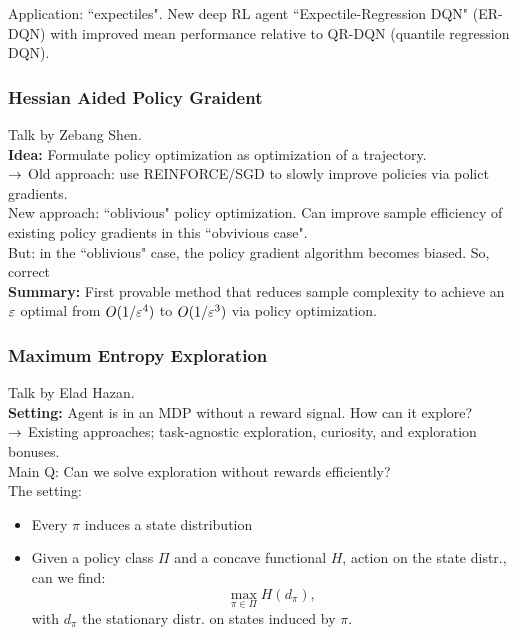  Application: ``expectiles". New deep RL agent ``Expectile-Regression DQN" (ER-DQN) with improved mean performance relative to QR-DQN (quantile regression DQN).
 
 \spacerule
 
 \subsubsection{Hessian Aided Policy Graident}
 Talk by Zebang Shen. \\
 
 {\bf Idea:} Formulate policy optimization as optimization of a trajectory. \\
 
 $\rightarrow$ Old approach: use REINFORCE/SGD to slowly improve policies via polict gradients. \\
 
 New approach: ``oblivious" policy optimization. Can improve sample efficiency of existing policy gradients in this ``obvivious case". \\
 
 But: in the ``oblivious" case, the policy gradient algorithm becomes biased. So, correct \\
 
 {\bf Summary:} First provable method that reduces sample complexity to achieve an $\varepsilon$ optimal from $O(1/\varepsilon^4)$ to $O(1/\varepsilon^3)$ via policy optimization.
 
 \spacerule
 
 \subsubsection{Maximum Entropy Exploration}
 
 Talk by Elad Hazan. \\
 
 {\bf Setting:} Agent is in an MDP without a reward signal. How can it explore? \\
 
 $\rightarrow$ Existing approaches; task-agnostic exploration, curiosity, and exploration bonuses. \\
 
 Main Q: Can we solve exploration without rewards efficiently? \\
 
 The setting:
 \begin{itemize}
     \item Every $\pi$ induces a state distribution
     \item Given a policy class $\Pi$ and a concave functional $H$, action on the state distr., can we find:
     \[
     \max_{\pi \in \Pi} H(d_\pi),
     \]
     with $d_\pi$ the stationary distr. on states induced by $\pi$.
 \end{itemize}
 
